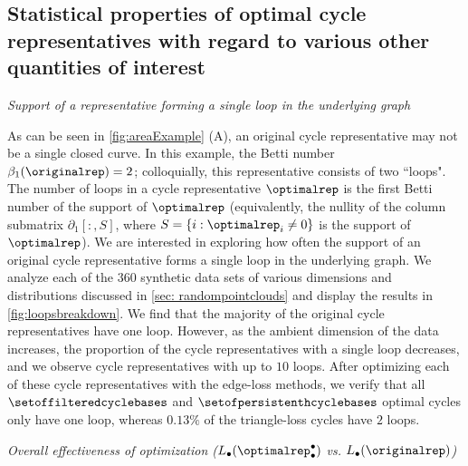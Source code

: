 \subsection{Statistical properties of optimal cycle representatives with regard to various other quantities of interest}



\noindent \emph{Support of a representative forming a single loop in the underlying graph}

As can be seen in \fig \ref{fig:areaExample} (A), an original cycle representative may not be a single closed curve. In this example, the Betti number $\beta_1(\originalrep)=2$; colloquially, this representative consists of two ``loops". The number of loops in a cycle representative $\optimalrep$ is the first Betti number of the support of $\optimalrep$ (equivalently, the nullity of the column submatrix $\partial_1[:, S]$, where $S = \{i : \optimalrep_i \neq 0\}$ is the support of $\optimalrep$). We are interested in exploring how often the support of an original cycle representative forms a single loop in the underlying graph. We analyze each of the 360 synthetic data sets of various dimensions and distributions discussed in \se \ref{sec: randompointclouds} and display the results in \fig \ref{fig:loopsbreakdown}. We find that the majority of the original cycle representatives have one loop. However, as the ambient dimension of the data increases, the proportion of the cycle representatives with a single loop decreases, and we observe cycle representatives with up to $10$ loops. After optimizing each of these cycle representatives with the edge-loss methods, we verify that all $\setoffilteredcyclebases$ and $\setofpersistenthcyclebases$ optimal cycles only have one loop, whereas $0.13\%$ of the triangle-loss cycles have $2$ loops. %







\noindent \emph{Overall effectiveness of optimization ($L_\bullet(\optimalrep_\bullet^\bullet)$ vs. $L_\bullet(\originalrep)$)} 

